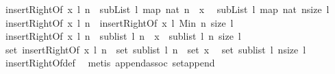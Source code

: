 \begin{isabellebody}
\isamarkupfalse%
\ {\isachardoublequoteopen}insertRightOf{}\ x\ l\ n\ {\isacharequal}{\isacharequal}\ {\isacharparenleft}subList\ l\ {\isacharparenleft}map\ nat\ {\isacharbrackleft}{}{\isachardot}{\isachardot}n{\isacharbrackright}{\isacharparenright}{\isacharparenright}\ {\isacharat}\ {\isacharbrackleft}x{\isacharbrackright}\ {\isacharat}\ \isanewline
{\isacharparenleft}subList\ l\ {\isacharparenleft}map\ nat\ {\isacharbrackleft}n{\isacharplus}{}{\isachardot}{\isachardot}size\ l\ {\isacharminus}\ {}{\isacharbrackright}{\isacharparenright}{\isacharparenright}{\isachardoublequoteclose}\isanewline
{}\isamarkupfalse%
\ {\isachardoublequoteopen}insertRightOf{}\ x\ l\ n\ {\isacharequal}{\isacharequal}\ insertRightOf{}\ x\ l\ {\isacharparenleft}Min\ {\isacharbraceleft}n{\isacharcomma}\ size\ l\ {\isacharminus}\ {}{\isacharbraceright}{\isacharparenright}{\isachardoublequoteclose}\isanewline
{}\isamarkupfalse%
\ {\isachardoublequoteopen}insertRightOf\ x\ l\ n\ {\isacharequal}\ sublist\ l\ {\isacharbraceleft}{}{\isachardot}{\isachardot}{\isacharless}{}{\isacharplus}n{\isacharbraceright}\ {\isacharat}\ {\isacharbrackleft}x{\isacharbrackright}\ {\isacharat}\ sublist\ l\ {\isacharbraceleft}n{\isacharplus}{}{\isachardot}{\isachardot}{\isacharless}\ {}{\isacharplus}size\ l{\isacharbraceright}{\isachardoublequoteclose}\isanewline
{}\isamarkupfalse%
\ {\isachardoublequoteopen}set\ {\isacharparenleft}insertRightOf\ x\ l\ n{\isacharparenright}\ {\isacharequal}\ set\ {\isacharparenleft}sublist\ l\ {\isacharbraceleft}{}{\isachardot}{\isachardot}{\isacharless}{}{\isacharplus}n{\isacharbraceright}{\isacharparenright}\ {\isasymunion}\ {\isacharparenleft}set\ {\isacharbrackleft}x{\isacharbrackright}{\isacharparenright}\ {\isasymunion}\ \isanewline
set\ {\isacharparenleft}sublist\ l\ {\isacharbraceleft}n{\isacharplus}{}{\isachardot}{\isachardot}{\isacharless}{}{\isacharplus}size\ l{\isacharbraceright}{\isacharparenright}{\isachardoublequoteclose}%
\isadelimproof
\ %
\endisadelimproof
%
\isatagproof
{}\isamarkupfalse%
\ insertRightOf{\isacharunderscore}def\ \isanewline
{}\isamarkupfalse%
\ {\isacharparenleft}metis\ append{\isacharunderscore}assoc\ set{\isacharunderscore}append{\isacharparenright}%
\endisatagproof
{\isafoldproof}%
%
\isadelimproof
%
\endisadelimproof
\isanewline
{}\isamarkupfalse%

\end{isabellebody}
